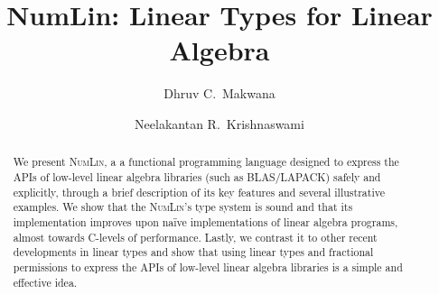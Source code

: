 \documentclass[runningheads,a4paper,twoside]{llncs}
\begin{document}
\title{NumLin: Linear Types for Linear Algebra}


\newcommand{\lang}{\textsc{NumLin}}

\author{Dhruv C.~Makwana \and
Neelakantan R.~Krishnaswami}
%

%
\maketitle
%
\begin{abstract}
    We present \lang, a a functional programming language designed to express
    the APIs of low-level linear algebra libraries (such as BLAS/LAPACK) safely
    and explicitly, through a brief description of its key features and several
    illustrative examples. We show that the \lang's type system is sound and that
    its implementation improves upon na{\"i}ve implementations of linear
    algebra programs, almost towards C-levels of performance. Lastly, we contrast
    it to other recent developments in linear types and show that using linear
    types and fractional permissions to express the APIs of low-level linear
    algebra libraries is a simple and effective idea.
\end{abstract}















\clearpage
\appendix

\end{document}
